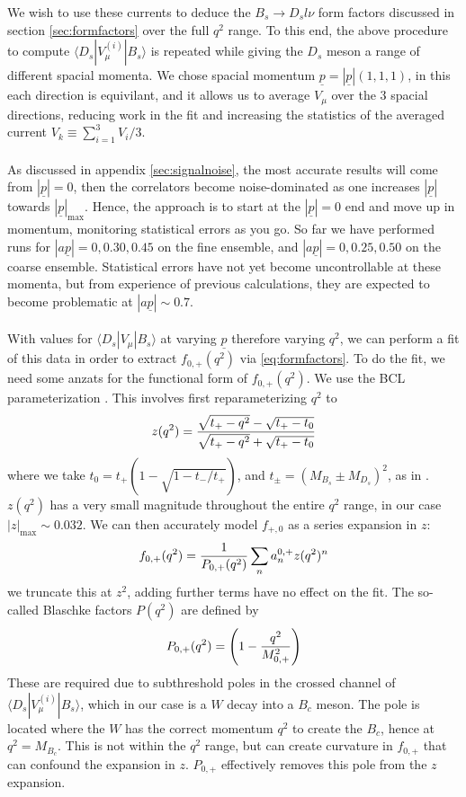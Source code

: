 We wish to use these currents to deduce the $B_s\to D_s l\nu$ form factors discussed in section \ref{sec:formfactors} over the full $q^2$ range. To this end, the above procedure to compute $\langle D_s | V^{(i)}_{\mu} | B_s \rangle$ is repeated while giving the $D_s$ meson a range of different spacial momenta. We chose spacial momentum $\underline{p} = |\underline{p}|(1,1,1)$, in this each direction is equivilant, and it allows us to average $V_{\mu}$ over the 3 spacial directions, reducing work in the fit and increasing the statistics of the averaged current $V_k \equiv \sum_{i=1}^3 V_i / 3$.
\\ \\
As discussed in appendix \ref{sec:signalnoise}, the most accurate results will come from $|\underline{p}| = 0$, then the correlators become noise-dominated as one increases $|\underline{p}|$ towards $|\underline{p}|_{\text{max}}$. Hence, the approach is to start at the $|\underline{p}|=0$ end and move up in momentum, monitoring statistical errors as you go. So far we have performed runs for $|a\underline{p}| = 0,0.30,0.45$ on the fine ensemble, and $|a\underline{p}|=0,0.25,0.50$ on the coarse ensemble. Statistical errors have not yet become uncontrollable at these momenta, but from experience of previous calculations, they are expected to become problematic at $|a\underline{p}| \sim 0.7$. 
\\ \\
With values for $\langle D_s | V_{\mu} | B_s \rangle$ at varying $\underline{p}$ therefore varying $q^2$, we can perform a fit of this data in order to extract $f_{0,+}(q^2)$ via \eqref{eq:formfactors}. To do the fit, we need some anzats for the functional form of $f_{0,+}(q^2)$. We use the BCL parameterization \cite{PhysRevD.79.013008}. This involves first reparameterizing $q^2$ to 
\begin{align}
	z(q^2) = {\sqrt{t_+ - q^2} - \sqrt{t_+ - t_0} \over \sqrt{t_+ - q^2} + \sqrt{t_+ - t_0} }
\end{align}
where we take $t_0 = t_+( 1 - \sqrt{1 - t_-/t_+})$, and $t_{\pm} = (M_{B_s} \pm M_{D_s})^2$, as in \cite{Hill:2006ub}. $z(q^2)$ has a very small magnitude throughout the entire $q^2$ range, in our case $|z|_{\text{max}} \sim 0.032$. We can then accurately model $f_{+,0}$ as a series expansion in $z$:
\begin{align}
	f_{0,+}(q^2) = {1\over P_{0,+}(q^2)} \sum_n a^{0,+}_n z(q^2)^n
	\label{eq:zexpansion}
\end{align}
we truncate this at $z^2$, adding further terms have no effect on the fit. The so-called Blaschke factors $P(q^2)$
are defined by
\begin{align}
	P_{0,+}(q^2) = \left( 1 - {q^2\over M_{0,+}^2}\right)
\end{align}
These are required due to subthreshold poles in the crossed channel of $\langle D_s | V^{(i)}_{\mu} | B_s \rangle$, which in our case is a $W$ decay into a $B_c$ meson. The pole is located where the $W$ has the correct momentum $q^2$ to create the $B_c$, hence at $q^2=M_{B_c}$. This is not within the $q^2$ range, but can create curvature in $f_{0,+}$ that can confound the expansion in $z$. $P_{0,+}$ effectively removes this pole from the $z$ expansion.

